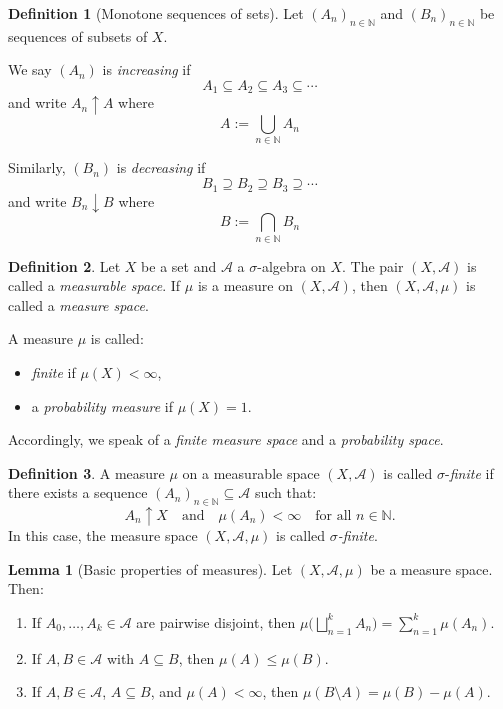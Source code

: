 \documentclass[12pt]{article}
\theoremstyle{definition}
\newtheorem{definition}{Definition}[section]
\newtheorem{lemma}[theorem]{Lemma}
\begin{document}
\medskip
\begin{definition}[Monotone sequences of sets]
Let \((A_n)_{n \in \mathbb{N}}\) and \((B_n)_{n \in \mathbb{N}}\) be sequences of subsets of \(X\).

We say \((A_n)\) is \emph{increasing} if 
\[
A_1 \subseteq A_2 \subseteq A_3 \subseteq \cdots
\]
and write \(A_n \uparrow A\) where
\[
A := \bigcup_{n \in \mathbb{N}} A_n
\]

Similarly, \((B_n)\) is \emph{decreasing} if
\[
B_1 \supseteq B_2 \supseteq B_3 \supseteq \cdots
\]
and write \(B_n \downarrow B\) where
\[
B := \bigcap_{n \in \mathbb{N}} B_n
\]
\end{definition}


\medskip
\begin{definition}
Let \(X\) be a set and \(\mathcal{A}\) a \(\sigma\)-algebra on \(X\). The pair \((X, \mathcal{A})\) is called a \emph{measurable space}.  
If \(\mu\) is a measure on \((X, \mathcal{A})\), then \((X, \mathcal{A}, \mu)\) is called a \emph{measure space}.

\medskip

A measure \(\mu\) is called:
\begin{itemize}
  \item \emph{finite} if \(\mu(X) < \infty\),
  \item a \emph{probability measure} if \(\mu(X) = 1\).
\end{itemize}

Accordingly, we speak of a \emph{finite measure space} and a \emph{probability space}.
\end{definition}


\medskip
\begin{definition}
A measure \(\mu\) on a measurable space \((X, \mathcal{A})\) is called \(\sigma\)-\emph{finite} if there exists a sequence \((A_n)_{n \in \mathbb{N}} \subseteq \mathcal{A}\) such that:
\[
A_n \uparrow X \quad \text{and} \quad \mu(A_n) < \infty \quad \text{for all } n \in \mathbb{N}.
\]
In this case, the measure space \((X, \mathcal{A}, \mu)\) is called \emph{\(\sigma\)-finite}.
\end{definition}


\medskip
\begin{lemma}[Basic properties of measures]
Let \((X,\mathcal{A},\mu)\) be a measure space. Then:
\renewcommand{\labelenumi}{(\roman{enumi})}
\begin{enumerate}
    \item If \(A_0, \ldots, A_k \in \mathcal{A}\) are pairwise disjoint, then \(\mu\big(\bigsqcup_{n=1}^k A_n\big) = \sum_{n=1}^k \mu(A_n)\).
    \item If \(A, B \in \mathcal{A}\) with \(A \subseteq B\), then \(\mu(A) \leq \mu(B)\).
    \item If \(A, B \in \mathcal{A}\), \(A \subseteq B\), and \(\mu(A) < \infty\), then \(\mu(B \setminus A) = \mu(B) - \mu(A)\).
\end{enumerate}
\end{lemma}
\end{document}
